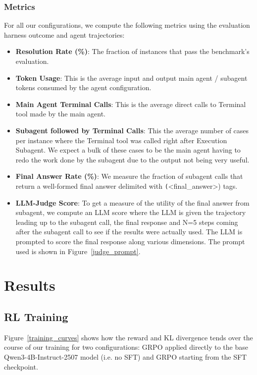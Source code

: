 \documentclass[sigconf,review]{acmart}
\begin{document}
\subsubsection{Metrics}
For all our configurations, we compute the following metrics using the evaluation harness outcome and agent trajectories:
\begin{itemize}
    \item \textbf{Resolution Rate (\%)}: The fraction of instances that pass the benchmark's evaluation.
    \item \textbf{Token Usage}: This is the average input and output main agent / subagent tokens consumed by the agent configuration.
    \item \textbf{Main Agent Terminal Calls}: This is the average direct calls to Terminal tool made by the main agent.
    \item \textbf{Subagent followed by Terminal Calls}: This the average number of cases per instance where the Terminal tool was called right after Execution Subagent. We expect a bulk of these cases to be the main agent having to redo the work done by the subagent due to the output not being very useful.
    \item \textbf{Final Answer Rate (\%)}: We measure the fraction of subagent calls that return a well-formed final answer delimited with \texttt(<final\_answer>) tags.
    \item \textbf{LLM-Judge Score}: To get a measure of the utility of the final answer from subagent, we compute an LLM score where the LLM is given the trajectory leading up to the subagent call, the final response and N=5 steps coming after the subagent call to see if the results were actually used. The LLM is prompted to score the final response along various dimensions. The prompt used is shown in Figure~\ref{judge_prompt}.
\end{itemize}

\section{Results}
\subsection{RL Training}
Figure~\ref{training_curves} shows how the reward and KL divergence tends over the course of our training for two configurations: GRPO applied directly to the base Qwen3-4B-Instruct-2507 model (i.e. no SFT) and GRPO starting from the SFT checkpoint.
\end{document}
